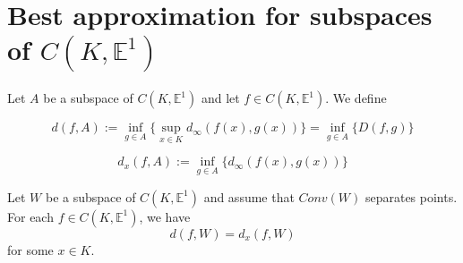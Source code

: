 \documentclass[12pt]{amsart}
\begin{document}



\section{Best approximation for subspaces of $C(K,\mathbb{E}^1)$}


\begin{definition}
Let $A$ be a subspace of $C(K,\mathbb{E}^1)$ and let $f\in C(K,\mathbb{E}^1)$. We define


$$d(f,A):=\inf_{g\in A}\{\sup_{x\in K}d_{\infty}(f(x),g(x))\}=\inf_{g\in A}\{D(f,g)\}$$

$$d_x(f,A):=\inf_{g\in A}\{d_{\infty}(f(x),g(x))\}$$
\end{definition}



\begin{theorem} \label{main} Let $W$ be a subspace of $C(K,\mathbb{E}^1)$ and assume that $Conv(W)$ separates points.
For each $f \in C(K,\mathbb{E}^1)$, we have
\[d(f,W)=d_x(f,W)\]
for some $x\in K$.
\end{theorem}
\end{document}

